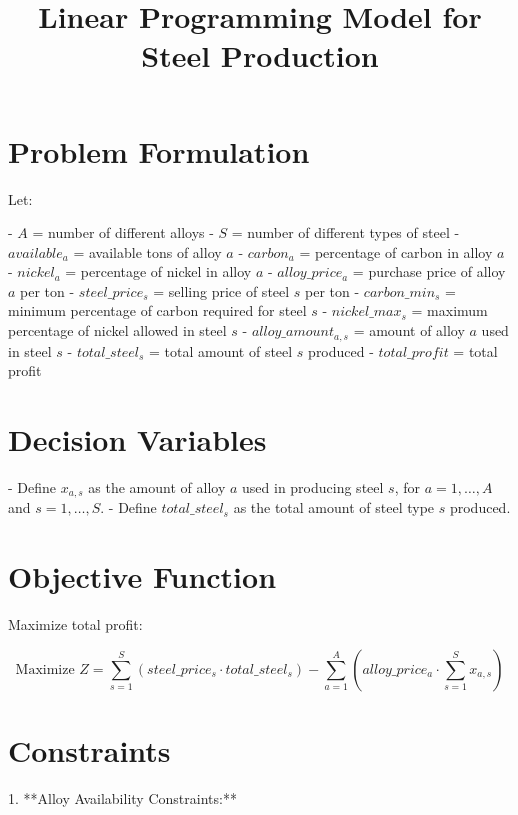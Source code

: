 \documentclass{article}
\begin{document}
\title{Linear Programming Model for Steel Production}
\author{}
\date{}
\maketitle

\section{Problem Formulation}

Let:

- \( A \) = number of different alloys
- \( S \) = number of different types of steel
- \( available_{a} \) = available tons of alloy \( a \)
- \( carbon_{a} \) = percentage of carbon in alloy \( a \)
- \( nickel_{a} \) = percentage of nickel in alloy \( a \)
- \( alloy\_price_{a} \) = purchase price of alloy \( a \) per ton
- \( steel\_price_{s} \) = selling price of steel \( s \) per ton
- \( carbon\_min_{s} \) = minimum percentage of carbon required for steel \( s \)
- \( nickel\_max_{s} \) = maximum percentage of nickel allowed in steel \( s \)
- \( alloy\_amount_{a,s} \) = amount of alloy \( a \) used in steel \( s \)
- \( total\_steel_{s} \) = total amount of steel \( s \) produced
- \( total\_profit \) = total profit

\section{Decision Variables}

- Define \( x_{a,s} \) as the amount of alloy \( a \) used in producing steel \( s \), for \( a = 1, \ldots, A \) and \( s = 1, \ldots, S \).
- Define \( total\_steel_{s} \) as the total amount of steel type \( s \) produced.

\section{Objective Function}

Maximize total profit:

\[
\text{Maximize } Z = \sum_{s=1}^{S} (steel\_price_{s} \cdot total\_steel_{s}) - \sum_{a=1}^{A} (alloy\_price_{a} \cdot \sum_{s=1}^{S} x_{a,s})
\]

\section{Constraints}

1. **Alloy Availability Constraints:**
\end{document}
